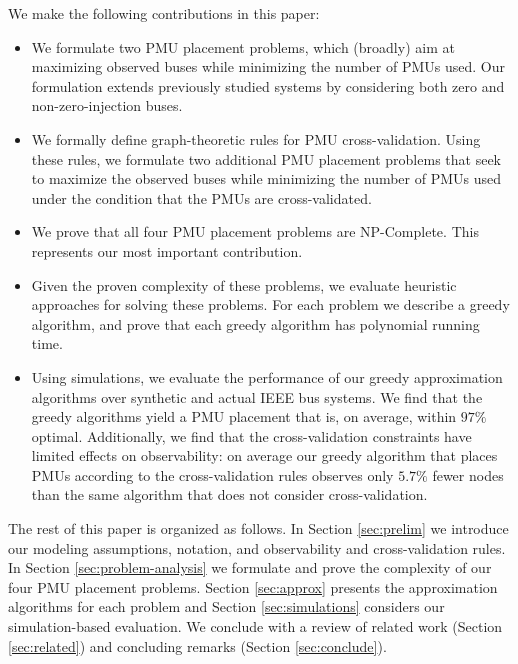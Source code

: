 We make the following contributions in this paper: 
\begin{itemize}
    \item We formulate two PMU placement problems, which (broadly) aim at maximizing observed buses while minimizing the number of PMUs used. Our formulation extends previously studied systems by 
	considering both zero and non-zero-injection buses.
    \item We formally define graph-theoretic rules for PMU cross-validation. Using these rules, we formulate two additional PMU placement problems that seek to maximize the observed buses while minimizing
	the number of PMUs used under the condition that the PMUs are cross-validated. %
    \item We prove that all four PMU placement problems are NP-Complete. This represents our most important contribution.
	\item Given the proven complexity of these problems, we evaluate heuristic approaches for solving these problems. For each problem we describe a greedy algorithm, and prove that each greedy
	algorithm has polynomial running time.
	\item Using simulations, we evaluate the performance of our greedy approximation algorithms over synthetic and actual
	IEEE bus systems. We find that the greedy algorithms yield a PMU placement that is, on average, within $97\%$ optimal. Additionally, we find that 
	the cross-validation constraints have limited effects on observability: on average our greedy algorithm that places PMUs according to the cross-validation rules observes 
	only $5.7\%$ fewer nodes than the same algorithm that does not consider cross-validation.
\end{itemize}

The rest of this paper is organized as follows. In Section \ref{sec:prelim} we introduce our modeling assumptions, notation, and observability and cross-validation rules. In Section \ref{sec:problem-analysis} we formulate and prove the complexity of our four PMU placement problems. Section \ref{sec:approx} presents the approximation algorithms for each problem and Section \ref{sec:simulations} considers our simulation-based evaluation. We conclude with a review of related work (Section \ref{sec:related}) and concluding remarks (Section \ref{sec:conclude}).
